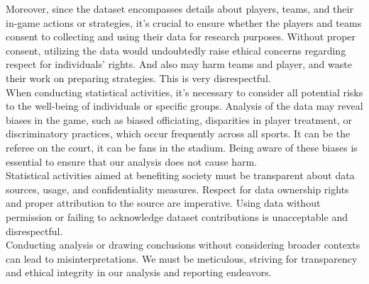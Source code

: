 \documentclass[
  a3paper,
]{article}
\begin{document}
Moreover, since the dataset encompasses details about players, teams,
and their in-game actions or strategies, it's crucial to ensure whether
the players and teams consent to collecting and using their data for
research purposes. Without proper consent, utilizing the data would
undoubtedly raise ethical concerns regarding respect for individuals'
rights. And also may harm teams and player, and waste their work on
preparing strategies. This is very disrespectful.\\

When conducting statistical activities, it's necessary to consider all
potential risks to the well-being of individuals or specific groups.
Analysis of the data may reveal biases in the game, such as biased
officiating, disparities in player treatment, or discriminatory
practices, which occur frequently across all sports. It can be the
referee on the court, it can be fans in the stadium. Being aware of
these biases is essential to ensure that our analysis does not cause
harm.\\

Statistical activities aimed at benefiting society must be transparent
about data sources, usage, and confidentiality measures. Respect for
data ownership rights and proper attribution to the source are
imperative. Using data without permission or failing to acknowledge
dataset contributions is unacceptable and disrespectful.\\

Conducting analysis or drawing conclusions without considering broader
contexts can lead to misinterpretations. We must be meticulous, striving
for transparency and ethical integrity in our analysis and reporting
endeavors.\\
\end{document}
